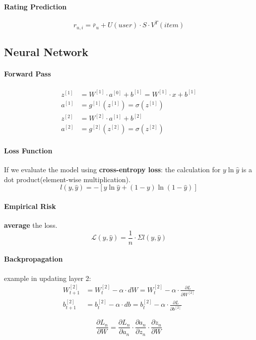 \paragraph{Rating Prediction}
$$r_{u,i} = \bar{r}_u + U(user) \cdot S \cdot V^T(item)$$


\subsection{Neural Network}
\paragraph{Forward Pass}
\begin{align*}
	z^{[1]} &= W^{[1]}\cdot a^{[0]} + b^{[1]} =  W^{[1]}\cdot x + b^{[1]}\\
	a^{[1]} &= g^{[1]}(z^{[1]}) = \sigma(z^{[1]}) \\
	z^{[2]} &= W^{[2]}\cdot a^{[1]} + b^{[2]} \\
	a^{[2]} &= g^{[2]}(z^{[2]}) = \sigma(z^{[2]})
\end{align*}

\paragraph{Loss Function} If we evaluate the model using \textbf{cross-entropy loss}: the calculation for $y \ln\hat{y}$ is a dot product(element-wise multiplication).
$$l(y,\hat{y}) = - [y \ln \hat{y} + (1-y)\ln(1 - \hat{y})]$$
\paragraph{Empirical Risk}  \textbf{average} the loss.
$$\mathcal{L}(y,\hat{y}) = \frac{1}{n} \cdot \Sigma l(y,\hat{y})$$

\paragraph{Backpropagation}

example in updating layer 2:
\begin{align*}
	W^{[2]}_{t+1} &= W^{[2]}_t - \alpha \cdot dW =W^{[2]}_t - \alpha \cdot \frac{\partial L}{\partial W^{[2]}} \\
	b^{[2]}_{t+1} &= b^{[2]}_t - \alpha \cdot db =b^{[2]}_t - \alpha \cdot \frac{\partial L}{\partial b^{[2]}} 
\end{align*}

	
$$\frac{\partial L_n}{\partial W} = \frac{\partial L_n}{\partial a_{n}} \cdot \frac{\partial a_{n}}{\partial z_{n}} \cdot \frac{\partial z_n}{\partial W}$$

